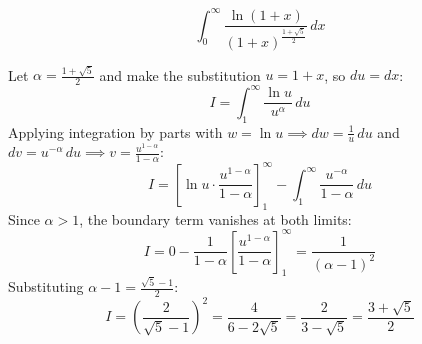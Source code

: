 \begin{questions}
\question 
\[ \int_{0}^{\infty} \frac{\ln(1 + x)}{(1 + x)^{\frac{1+\sqrt{5}}{2}}} \, dx \]
\begin{solution}
Let $\alpha = \frac{1+\sqrt{5}}{2}$ and make the substitution $u = 1 + x$, so $du = dx$:
\[ I = \int_{1}^{\infty} \frac{\ln u}{u^\alpha} \, du \]
Applying integration by parts with $w = \ln u \implies dw = \frac{1}{u} \, du$ and $dv = u^{-\alpha} \, du \implies v = \frac{u^{1-\alpha}}{1-\alpha}$:
\[ I = \left[ \ln u \cdot \frac{u^{1-\alpha}}{1-\alpha} \right]_{1}^{\infty} - \int_{1}^{\infty} \frac{u^{-\alpha}}{1-\alpha} \, du \]
Since $\alpha > 1$, the boundary term vanishes at both limits:
\[ I = 0 - \frac{1}{1-\alpha} \left[ \frac{u^{1-\alpha}}{1-\alpha} \right]_{1}^{\infty} = \frac{1}{(\alpha - 1)^2} \]
Substituting $\alpha - 1 = \frac{\sqrt{5}-1}{2}$:
\[ I = \left( \frac{2}{\sqrt{5}-1} \right)^2 = \frac{4}{6-2\sqrt{5}} = \frac{2}{3-\sqrt{5}} = \frac{3+\sqrt{5}}{2} \]
\end{solution}
\end{questions}

